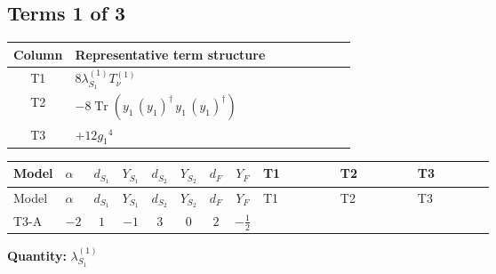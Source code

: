 \documentclass[8pt]{article}
\begin{document}
\begin{landscape}
\subsection*{Terms 1 of 3}
\begin{center}
\begin{tabular}{@{}c >{\raggedright\arraybackslash}p{0.82\linewidth}@{}}
\toprule
Column & Representative term structure \\
\midrule
T1 & \(\displaystyle 8 {\lambda_{S_1}^{(1)}} T_{\nu}^{(1)}\) \\
\midrule
T2 & \(\displaystyle -8 \operatorname{Tr}\!\left({y_1}\,\left({y_1}\right)^{\dagger}\,{y_1}\,\left({y_1}\right)^{\dagger}\right)\) \\
\midrule
T3 & \(\displaystyle +12 {g_1}^4\) \\
\midrule
\bottomrule
\end{tabular}
\end{center}
\smallskip
\tiny
\begin{longtable}{@{}llcccccc >{\raggedright\arraybackslash}p{0.21\linewidth} >{\raggedright\arraybackslash}p{0.21\linewidth} >{\raggedright\arraybackslash}p{0.21\linewidth}@{}}
\toprule
Model & $\alpha$ & $d_{S_1}$ & $Y_{S_1}$ & $d_{S_2}$ & $Y_{S_2}$ & $d_F$ & $Y_F$ & T1 & T2 & T3 \\
\midrule
\endfirsthead
\toprule
Model & $\alpha$ & $d_{S_1}$ & $Y_{S_1}$ & $d_{S_2}$ & $Y_{S_2}$ & $d_F$ & $Y_F$ & T1 & T2 & T3 \\
\midrule
\endhead
T3-A & $-2$ & $1$ & $-1$ & $3$ & $0$ & $2$ & $-\frac{1}{2}$ & \scriptsize\adjustbox{max width=\linewidth}{$\begin{gathered} 8 {\lambda_{S_1}^{(1)}} T_{\nu}^{(1)}\end{gathered}$} & \scriptsize\adjustbox{max width=\linewidth}{$\begin{gathered} -8 \operatorname{Tr}\!\left({y_1}\,\left({y_1}\right)^{\dagger}\,{y_1}\,\left({y_1}\right)^{\dagger}\right)\end{gathered}$} & \scriptsize\adjustbox{max width=\linewidth}{$\begin{gathered} +12 {g_1}^4\end{gathered}$} \\
\midrule
\bottomrule
\end{longtable}
\clearpage
\noindent\textbf{Quantity: }$\lambda_{S_1}^{(1)}$\par\smallskip

\end{landscape}
\end{document}
